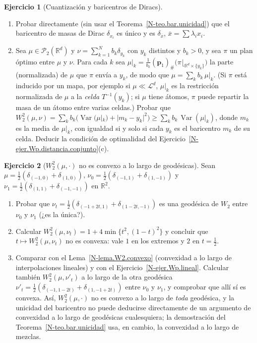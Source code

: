 \documentclass[11pt,a4paper]{amsart}
\newcounter{chapter}
\newcommand{\R}{{\mathbb R}}
\newcommand{\LL}{{\mathcal L}}
\newcommand{\pp}{{\mathbf p}}
\theoremstyle{remark}
\theoremstyle{definition}
\newtheorem{ejercicio}{Ejercicio}[chapter]
\numberwithin{subsection}{section}
\numberwithin{equation}{section}
\begin{document}
\begin{ejercicio}[Cuantización y baricentros de Diracs]\label{ejer.bar.cuantizacion}
\leavevmode
\begin{enumerate}[label=(\alph*)]
\item Probar directamente (sin usar el Teorema~\ref{N-teo.bar.unicidad}) que
el baricentro de masas de Dirac $\delta_{x_i}$ es único y es
$\delta_{\bar x}$, $\bar x=\sum\lambda_ix_i$.
\item Sea $\mu\in\mathcal P_2(\R^d)$ y $\nu=\sum_{k=1}^Nb_k\delta_{y_k}$ con
$y_k$ distintos y $b_k>0$, y sea $\pi$ un plan óptimo entre $\mu$ y $\nu$.
Para cada $k$ sea
$\mu|_k=\frac1{b_k}(\pp_1)_\#\bigl(\pi\lfloor_{\R^d\times\{y_k\}}\bigr)$ la
parte (normalizada) de $\mu$ que $\pi$ envía a $y_k$, de modo que
$\mu=\sum_kb_k\,\mu|_k$. (Si $\pi$ está inducido por un mapa, por ejemplo si
$\mu\ll\LL^d$, $\mu|_k$ es la restricción normalizada de $\mu$ a la
\emph{celda} $T^{-1}(y_k)$; si $\mu$ tiene átomos, $\pi$ puede repartir la
masa de un átomo entre varias celdas.) Probar que
$W_2^2(\mu,\nu)=\sum_kb_k\bigl(\operatorname{Var}(\mu|_k)+|m_k-y_k|^2\bigr)
\ge\sum_kb_k\,\operatorname{Var}(\mu|_k)$, donde $m_k$ es la media de
$\mu|_k$, con igualdad si y solo si cada $y_k$ es el baricentro $m_k$ de su
celda. Deducir la condición de optimalidad del
Ejercicio~\ref{N-ejer.Wp.distancia.conjunto}(c).
\end{enumerate}
\end{ejercicio}

\begin{ejercicio}[$W_2^2(\mu,\cdot)$ no es convexo a lo largo de geodésicas]\label{ejer.bar.no.convexa.geodesica}
Sean $\mu=\frac12(\delta_{(-1,0)}+\delta_{(1,0)})$,
$\nu_0=\frac12(\delta_{(-1,1)}+\delta_{(1,-1)})$ y
$\nu_1=\frac12(\delta_{(1,1)}+\delta_{(-1,-1)})$ en $\R^2$.
\begin{enumerate}[label=(\alph*)]
\item Probar que $\nu_t=\frac12(\delta_{(-1+2t,1)}+\delta_{(1-2t,-1)})$ es una
geodésica de $W_2$ entre $\nu_0$ y $\nu_1$ (¿es la única?).
\item Calcular $W_2^2(\mu,\nu_t)=1+4\min\{t^2,(1-t)^2\}$ y concluir que
$t\mapsto W_2^2(\mu,\nu_t)$ no es convexa: vale $1$ en los extremos y $2$ en
$t=\frac12$.
\item Comparar con el Lema~\ref{N-lema.W2.convexo} (convexidad a lo largo de
interpolaciones lineales) y con el Ejercicio~\ref{N-ejer.Wp.lineal}. Calcular
también $W_2^2(\mu,\nu'_t)$ a lo largo de la otra geodésica
$\nu'_t=\frac12(\delta_{(-1,1-2t)}+\delta_{(1,-1+2t)})$ entre $\nu_0$ y $\nu_1$,
y comprobar que allí sí es convexa. Así, $W_2^2(\mu,\cdot)$ no es convexo a
lo largo de \emph{toda} geodésica, y la unicidad del baricentro no puede
deducirse directamente de un argumento de convexidad a lo largo de
geodésicas cualesquiera; la demostración del Teorema~\ref{N-teo.bar.unicidad}
usa, en cambio, la convexidad a lo largo de mezclas.
\end{enumerate}
\end{ejercicio}
\end{document}
